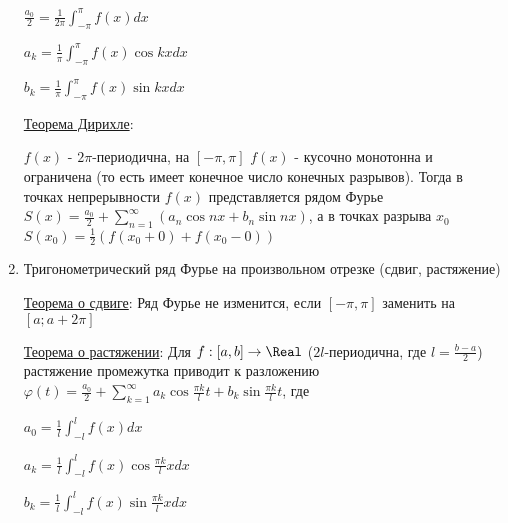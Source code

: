 \begin{enumerate}
    $\frac{a_0}{2} = \frac{1}{2\pi} \int_{-\pi}^\pi f(x) dx$ 
    
    $a_k = \frac{1}{\pi} \int_{-\pi}^\pi f(x) \cos kx dx$
    
    $b_k = \frac{1}{\pi} \int_{-\pi}^\pi f(x) \sin kx dx$

    \hyperlink{dirichletstheorem}{Теорема Дирихле}:

    \Ths $f(x)$ - $2\pi$-периодична, на $[-\pi, \pi]$ $f(x)$ - кусочно монотонна и ограничена (то есть имеет конечное число конечных разрывов). 
    Тогда в точках непрерывности $f(x)$ представляется рядом Фурье $S(x) = \frac{a_0}{2} + \sum_{n = 1}^\infty (a_n \cos nx + b_n \sin nx)$,
    а в точках разрыва $x_0$ $S(x_0) = \frac{1}{2} (f(x_0 + 0) + f(x_0 - 0))$

    \item Тригонометрический ряд Фурье на произвольном отрезке (сдвиг, растяжение)

    \hyperlink{shifttheorem}{Теорема о сдвиге}:  Ряд Фурье не изменится, если $[-\pi, \pi]$ заменить на $[a; a + 2\pi]$

    \hyperlink{stretchingtheorem}{Теорема о растяжении}:  Для $f : [a, b] \to \Real$ ($2l$-периодична, где $l = \frac{b - a}{2}$) растяжение промежутка приводит к разложению
    $\varphi(t) = \frac{a_0}{2} + \sum_{k = 1}^\infty a_k \cos \frac{\pi k}{l} t + b_k \sin \frac{\pi k}{l} t$, где

    $a_0 = \frac{1}{l} \int_{-l}^l f(x) dx$

    $a_k = \frac{1}{l} \int_{-l}^l f(x) \cos \frac{\pi k}{l} x dx$

    $b_k = \frac{1}{l} \int_{-l}^l f(x) \sin \frac{\pi k}{l} x dx$

    

\end{enumerate}
